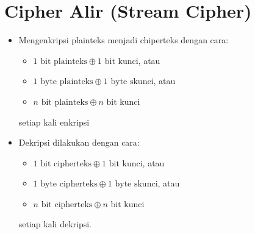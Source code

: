 \documentclass{article}
\begin{document}

\section*{Cipher Alir (Stream Cipher)}

\begin{itemize}
    \item Mengenkripsi plainteks menjadi chiperteks dengan cara:
    \begin{itemize}
        \item $1 \text{ bit plainteks} \oplus 1 \text{ bit kunci}$, atau
        \item $1 \text{ byte plainteks} \oplus 1 \text{ byte skunci}$, atau
        \item $n \text{ bit plainteks} \oplus n \text{ bit kunci}$
    \end{itemize}
    setiap kali enkripsi
    
    \item Dekripsi dilakukan dengan cara:
    \begin{itemize}
        \item $1 \text{ bit cipherteks} \oplus 1 \text{ bit kunci}$, atau
        \item $1 \text{ byte cipherteks} \oplus 1 \text{ byte skunci}$, atau
        \item $n \text{ bit cipherteks} \oplus n \text{ bit kunci}$
    \end{itemize}
    setiap kali dekripsi.
\end{itemize}
\end{document}
